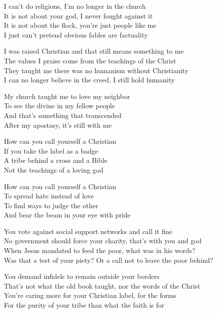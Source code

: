 \begin{lyrics}
I can't do religions, I'm no longer in the church\\
It is not about your god, I never fought against it\\
It is not about the flock, you're just people like me\\
I just can't pretend obvious fables are factuality

I was raised Christian and that still means something to me\\
The values I praise come from the teachings of the Christ\\
They taught me there was no humanism without Christianity\\
I can no longer believe in the creed, I still hold humanity

My church taught me to love my neighbor\\
To see the divine in my fellow people\\
And that's something that transcended\\
After my apostasy, it's still with me

How can you call yourself a Christian\\
If you take the label as a badge\\
A tribe behind a cross and a Bible\\
Not the teachings of a loving god

How can you call yourself a Christian\\
To spread hate instead of love\\
To find ways to judge the other\\
And bear the beam in your eye with pride

You vote against social support networks and call it fine\\
No government should force your charity, that's with you and god\\
When Jesus mandated to feed the poor, what was in his words?\\
Was that a test of your piety? Or a call not to leave the poor behind?

You demand infidels to remain outside your borders\\
That's not what the old book taught, nor the words of the Christ\\
You're caring more for your Christian label, for the forms\\
For the purity of your tribe than what the faith is for


\end{lyrics}
